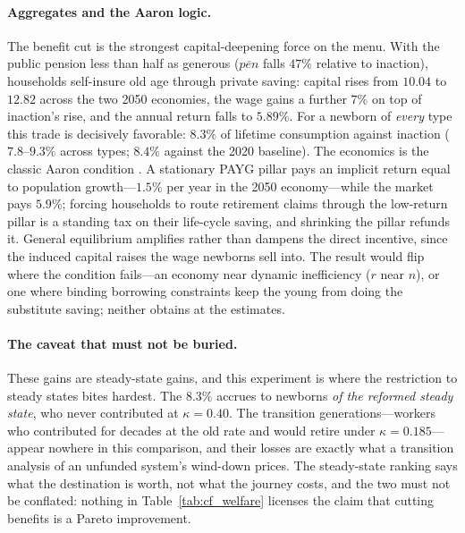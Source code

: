 \documentclass[12pt,a4paper]{article}
\begin{document}
\paragraph{Aggregates and the Aaron logic.} The benefit cut is the strongest capital-deepening force on the menu. With the public pension less than half as generous ($\overline{pen}$ falls $47\%$ relative to inaction), households self-insure old age through private saving: capital rises from $10.04$ to $12.82$ across the two 2050 economies, the wage gains a further $7\%$ on top of inaction's rise, and the annual return falls to $5.89\%$. For a newborn of \emph{every} type this trade is decisively favorable: $8.3\%$ of lifetime consumption against inaction ($7.8$--$9.3\%$ across types; $8.4\%$ against the 2020 baseline). The economics is the classic Aaron condition \citep{Aaron1966}. A stationary PAYG pillar pays an implicit return equal to population growth---$1.5\%$ per year in the 2050 economy---while the market pays $5.9\%$; forcing households to route retirement claims through the low-return pillar is a standing tax on their life-cycle saving, and shrinking the pillar refunds it. General equilibrium amplifies rather than dampens the direct incentive, since the induced capital raises the wage newborns sell into. The result would flip where the condition fails---an economy near dynamic inefficiency ($r$ near $n$), or one where binding borrowing constraints keep the young from doing the substitute saving; neither obtains at the estimates.

\paragraph{The caveat that must not be buried.} These gains are steady-state gains, and this experiment is where the restriction to steady states bites hardest. The $8.3\%$ accrues to newborns \emph{of the reformed steady state}, who never contributed at $\kappa=0.40$. The transition generations---workers who contributed for decades at the old rate and would retire under $\kappa=0.185$---appear nowhere in this comparison, and their losses are exactly what a transition analysis of an unfunded system's wind-down prices. The steady-state ranking says what the destination is worth, not what the journey costs, and the two must not be conflated: nothing in Table~\ref{tab:cf_welfare} licenses the claim that cutting benefits is a Pareto improvement.
\end{document}
